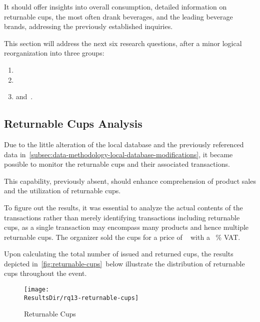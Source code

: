 It should offer insights into overall consumption, detailed information on returnable cups, the most often drank beverages, and the leading beverage brands, addressing the previously established inquiries.

This section will address the next six research questions, after a minor logical reorganization into three groups:
\begin{enumerate}
	\item {}
	\item {}
	\item and~.
\end{enumerate}


\subsection{Returnable Cups Analysis}
\label{subsec:analysis-beverage-returnable-cups}

Due to the little alteration of the local database and the previously referenced data in~\autoref{subsec:data-methodology-local-database-modifications}, it became possible to monitor the returnable cups and their associated transactions.

This capability, previously absent, should enhance comprehension of product sales and the utilization of returnable cups.


To figure out the results, it was essential to analyze the actual contents of the transactions rather than merely identifying transactions including returnable cups,
as a single transaction may encompass many products and hence multiple returnable cups.
The organizer sold the cups for a price of ~ with a ~\% VAT.\

Upon calculating the total number of issued and returned cups, the results depicted in~\autoref{fig:returnable-cups}~below illustrate the distribution of returnable cups throughout the event.

\begin{figure}[H]
	\centering
	\texttt{[image: \\ResultsDir/rq13-returnable-cups]}
	\caption{Returnable Cups}
	\label{fig:returnable-cups}
	\source
\end{figure}

